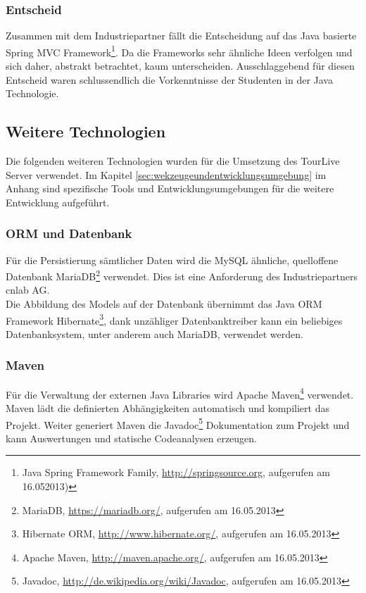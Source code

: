 \subsubsection{Entscheid}
Zusammen mit dem Industriepartner fällt die Entscheidung auf das Java basierte Spring MVC Framework\footnote{Java Spring Framework Family, \url{http://springsource.org}, aufgerufen am 16.052013)}. Da die Frameworks sehr ähnliche Ideen verfolgen und sich daher, abstrakt betrachtet, kaum unterscheiden. Ausschlaggebend für diesen Entscheid waren schlussendlich die Vorkenntnisse der Studenten in der Java Technologie. 

\subsection{ Weitere Technologien}
Die folgenden weiteren Technologien wurden für die Umsetzung des TourLive Server verwendet. Im Kapitel \ref{sec:wekzeugeundentwicklungsumgebung} im Anhang sind spezifische Tools und Entwicklungsumgebungen für die weitere Entwicklung aufgeführt.

\subsubsection{ORM und Datenbank}
Für die Persistierung sämtlicher Daten wird die MySQL ähnliche, quelloffene Datenbank MariaDB\footnote{MariaDB, \url{https://mariadb.org/}, aufgerufen am 16.05.2013} verwendet. Dies ist eine Anforderung des Industriepartners cnlab AG.
\\

Die Abbildung des Models auf der Datenbank übernimmt das Java ORM Framework Hibernate\footnote{Hibernate ORM, \url{http://www.hibernate.org/}, aufgerufen am 16.05.2013}, dank unzähliger Datenbanktreiber kann ein beliebiges Datenbanksystem, unter anderem auch MariaDB, verwendet werden.

\subsubsection{Maven}
Für die Verwaltung der externen Java Libraries wird Apache Maven\footnote{Apache Maven, \url{http://maven.apache.org/}, aufgerufen am 16.05.2013} verwendet. Maven lädt die definierten Abhängigkeiten automatisch und kompiliert das Projekt. Weiter generiert Maven die Javadoc\footnote{Javadoc, \url{http://de.wikipedia.org/wiki/Javadoc}, aufgerufen am 16.05.2013} Dokumentation zum Projekt und kann Auswertungen und statische Codeanalysen erzeugen.

